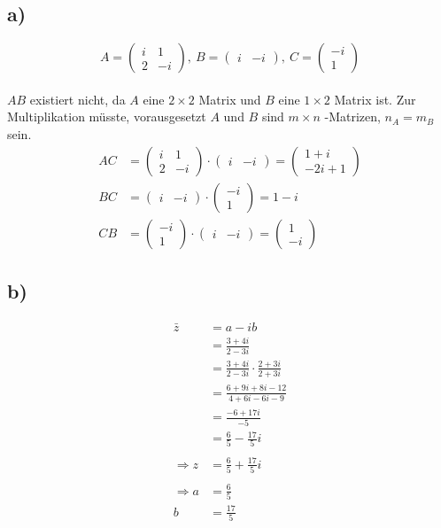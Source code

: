 \documentclass[a4paper]{scrartcl}
\begin{document}
\subsection{a)}
\[
A=\begin{pmatrix}
i & 1 \\
2 & -i
\end{pmatrix},\ 
B=\begin{pmatrix}
i & -i
\end{pmatrix},\ 
C=\begin{pmatrix}
-i \\
1
\end{pmatrix}
\] \\
\(AB\) existiert nicht, da \(A\) eine \(2\times 2\) Matrix und \(B\) eine \(1\times 2\) Matrix ist. Zur Multiplikation müsste, vorausgesetzt \(A\) und \(B\) sind \(m\times n\) -Matrizen, \(n_A=m_B\) sein.
\begin{align}
AC&=
\begin{pmatrix}
i & 1 \\
2 & -i
\end{pmatrix}\cdot
\begin{pmatrix}
i & -i
\end{pmatrix}=
\begin{pmatrix}
1+i \\
-2i+1
\end{pmatrix} \\
BC&=
\begin{pmatrix}
i & -i
\end{pmatrix}\cdot
\begin{pmatrix}
-i \\
1
\end{pmatrix}=
1-i \\
CB&=
\begin{pmatrix}
-i \\
1
\end{pmatrix}
\cdot
\begin{pmatrix}
i & -i
\end{pmatrix}=
\begin{pmatrix}
1 \\
-i
\end{pmatrix}
\end{align}

\subsection{b)}
\begin{align}
\bar{z}&=a-ib \\
	&=\frac{3+4i}{2-3i} \\
	&=\frac{3+4i}{2-3i}\cdot\frac{2+3i}{2+3i} \\
	&=\frac{6+9i+8i-12}{4+6i-6i-9} \\
	&=\frac{-6+17i}{-5} \\
	&=\frac{6}{5}-\frac{17}{5}i \\ \\
\Rightarrow z&=\frac{6}{5}+\frac{17}{5}i \\ \\
\Rightarrow a&=\frac{6}{5} \\
	b&=\frac{17}{5}
\end{align}
\end{document}
